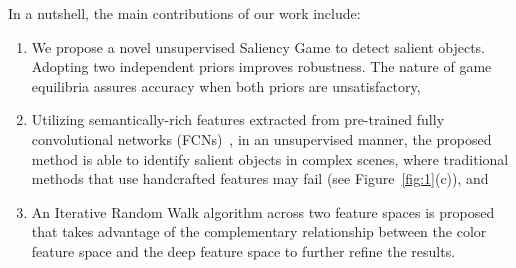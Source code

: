 \documentclass[journal]{IEEEtran}
\begin{document}
In a nutshell, the main contributions of our work include: 
\begin{enumerate}
\item We propose a novel unsupervised Saliency Game to detect salient objects. Adopting two independent priors improves robustness. The nature of game equilibria assures accuracy when both priors are unsatisfactory,
\item Utilizing semantically-rich features extracted from pre-trained fully convolutional networks (FCNs)~\cite{Long2015Fully}, in an unsupervised manner, the proposed method is able to identify salient objects in complex scenes, where traditional methods that use handcrafted features may fail (see Figure~\ref{fig:1}(c)), and
\item An Iterative Random Walk algorithm across two feature spaces is proposed that takes advantage of the complementary relationship between the color feature space and the deep feature space to further refine the results. 
\end{enumerate}
\end{document}
